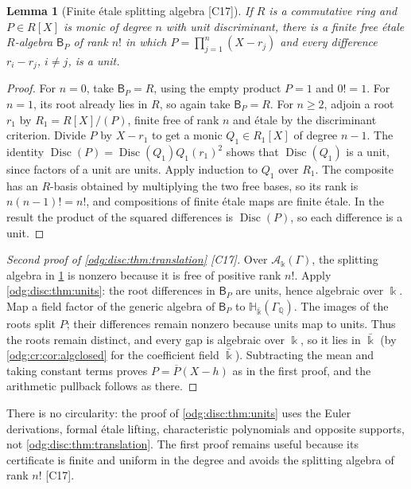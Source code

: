 \documentclass[11pt,oneside]{article}
\numberwithin{equation}{section}
\newtheorem{lemma}[lemma]{Lemma}
\theoremstyle{definition}
\theoremstyle{remark}
\newcommand{\Q}{\mathbb Q}
\newcommand{\src}[1]{\textup{\textsf{\small[#1]}}}
\newcommand{\crA}{\mathcal A_\Bbbk(\Gamma)}
\newcommand{\Disc}{\operatorname{Disc}}
\newcommand{\Hbar}{\mathbb H_{\bar\Bbbk}(\Gamma_\Q)}
\begin{document}
\begin{lemma}[Finite \'etale splitting algebra \src{C17}]\label{odg:disc:lem:splitting}
If $R$ is a commutative ring and $P\in R[X]$ is monic of degree $n$ with unit discriminant,
there is a finite free \'etale $R$-algebra $\mathsf B_P$ of rank $n!$ in which
$P=\prod_{j=1}^n(X-r_j)$ and every difference $r_i-r_j$, $i\ne j$, is a unit.
\end{lemma}
\begin{proof}
For $n=0$, take $\mathsf B_P=R$, using the empty product $P=1$ and $0!=1$.
For $n=1$, its root already lies in $R$, so again take $\mathsf B_P=R$.
For $n\ge2$, adjoin a root $r_1$ by $R_1=R[X]/(P)$, finite free of rank $n$ and \'etale by the
discriminant criterion. Divide $P$ by $X-r_1$ to get a monic $Q_1\in R_1[X]$ of degree
$n-1$. The identity $\Disc(P)=\Disc(Q_1)Q_1(r_1)^2$ shows that $\Disc(Q_1)$ is a unit,
since factors of a unit are units. Apply induction to $Q_1$ over $R_1$.
The composite has an $R$-basis obtained by multiplying the two free bases, so its
rank is $n(n-1)!=n!$, and
compositions of finite \'etale maps are finite \'etale. In the result the product of the
squared differences is $\Disc(P)$, so each difference is a unit.
\end{proof}

\begin{proof}[Second proof of \cref{odg:disc:thm:translation} \src{C17}]
Over $\crA$, the splitting algebra in \cref{odg:disc:lem:splitting} is nonzero because
it is free of positive rank $n!$. Apply \cref{odg:disc:thm:units}: the root
differences in $\mathsf B_P$ are units, hence algebraic over $\Bbbk$. Map a field factor of
the generic algebra of $\mathsf B_P$ to $\Hbar$. The images of the roots split $P$;
their differences remain nonzero because units map to units. Thus the roots remain
distinct, and
every gap is algebraic over $\Bbbk$, so it lies in $\bar\Bbbk$ (by \cref{odg:cr:cor:algclosed}
for the coefficient field $\bar\Bbbk$).
Subtracting the mean and taking constant terms proves $P=\overline P(X-h)$ as in the first
proof, and the arithmetic pullback follows as there.
\end{proof}

There is no circularity: the proof of \cref{odg:disc:thm:units} uses the Euler derivations,
formal \'etale lifting, characteristic polynomials and opposite supports, not
\cref{odg:disc:thm:translation}. The first proof remains useful because its certificate is
finite and uniform in the degree and avoids the splitting algebra of rank $n!$ \src{C17}.
\end{document}
